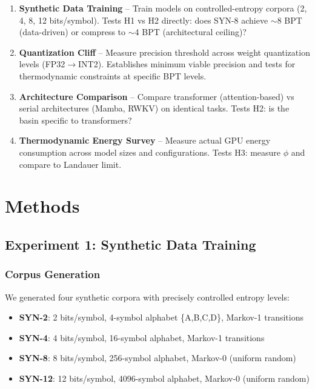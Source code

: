 \documentclass[11pt,a4paper]{article}
\begin{document}
\begin{enumerate}
\item \textbf{Synthetic Data Training} -- Train models on controlled-entropy corpora (2, 4, 8, 12 bits/symbol). Tests H1 vs H2 directly: does SYN-8 achieve $\sim$8 BPT (data-driven) or compress to $\sim$4 BPT (architectural ceiling)?

\item \textbf{Quantization Cliff} -- Measure precision threshold across weight quantization levels (FP32$\rightarrow$INT2). Establishes minimum viable precision and tests for thermodynamic constraints at specific BPT levels.

\item \textbf{Architecture Comparison} -- Compare transformer (attention-based) vs serial architectures (Mamba, RWKV) on identical tasks. Tests H2: is the basin specific to transformers?

\item \textbf{Thermodynamic Energy Survey} -- Measure actual GPU energy consumption across model sizes and configurations. Tests H3: measure $\phi$ and compare to Landauer limit.
\end{enumerate}

\section{Methods}

\subsection{Experiment 1: Synthetic Data Training}

\subsubsection{Corpus Generation}

We generated four synthetic corpora with precisely controlled entropy levels:

\begin{itemize}
\item \textbf{SYN-2}: 2 bits/symbol, 4-symbol alphabet \{A,B,C,D\}, Markov-1 transitions
\item \textbf{SYN-4}: 4 bits/symbol, 16-symbol alphabet, Markov-1 transitions
\item \textbf{SYN-8}: 8 bits/symbol, 256-symbol alphabet, Markov-0 (uniform random)
\item \textbf{SYN-12}: 12 bits/symbol, 4096-symbol alphabet, Markov-0 (uniform random)
\end{itemize}
\end{document}
